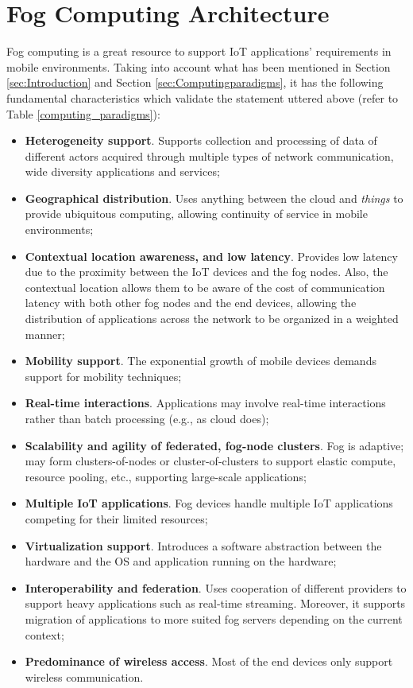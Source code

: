 \section{Fog Computing Architecture}
\label{sec:fog_architecture}
Fog computing is a great resource to support IoT applications' requirements in mobile environments. Taking into account what has been mentioned in Section \ref{sec:Introduction} and Section \ref{sec:Computingparadigms}, it has the following fundamental characteristics which validate the statement uttered above (refer to Table \ref{computing_paradigms}):
\begin{itemize}[noitemsep]
	\item \textbf{Heterogeneity support}. Supports collection and processing of data of different actors acquired through multiple types of network communication, wide diversity applications and services;
	\item \textbf{Geographical distribution}. Uses anything between the cloud and \textit{things} to provide ubiquitous computing, allowing continuity of service in mobile environments;
	\item \textbf{Contextual location awareness, and low latency}. Provides low latency due to the proximity between the IoT devices and the fog nodes. Also, the contextual location allows them to be aware of the cost of communication latency with both other fog nodes and the end devices, allowing the distribution of applications across the network to be organized in a weighted manner;
	\item \textbf{Mobility support}. The exponential growth of mobile devices demands support for mobility techniques;
	\item \textbf{Real-time interactions}. Applications may involve real-time interactions rather than batch processing (e.g., as cloud does);
	\item \textbf{Scalability and agility of federated, fog-node clusters}. Fog is adaptive; may form clusters-of-nodes or cluster-of-clusters to support elastic compute, resource pooling, etc., supporting large-scale applications;
	\item \textbf{Multiple IoT applications}. Fog devices handle multiple IoT applications competing for their limited resources;
	\item \textbf{Virtualization support}. Introduces a software abstraction between the hardware and the OS and application running on the hardware;
	\item \textbf{Interoperability and federation}. Uses cooperation of different providers to support heavy applications such as real-time streaming. Moreover, it supports migration of applications to more suited fog servers depending on the current context;
	\item \textbf{Predominance of wireless access}. Most of the end devices only support wireless communication.
\end{itemize}

